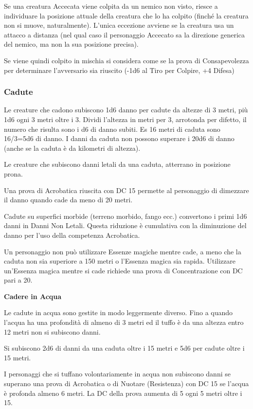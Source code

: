 \documentclass[a4paper,11pt,twoside,openany]{book}
\begin{document}
Se una creatura Accecata viene colpita da un nemico non visto, riesce a individuare la posizione attuale della creatura che lo ha colpito (finché la creatura non si muove, naturalmente). L'unica eccezione avviene se la creatura usa un attacco a distanza (nel qual caso il personaggio Accecato sa la direzione generica del nemico, ma non la sua posizione precisa).

Se viene quindi colpito in mischia si considera come se la prova di Consapevolezza per determinare l'avversario sia riuscito (-1d6 al Tiro per Colpire, +4 Difesa)

\subsubsection{Cadute}

\label{cadute}

Le creature che cadono subiscono 1d6 danno per cadute da altezze di 3 metri, più 1d6 ogni 3 metri oltre i 3. Dividi l'altezza in metri per 3, arrotonda per difetto, il numero che risulta sono i d6 di danno subiti. Es 16 metri di caduta sono 16/3=5d6 di danno. I danni da caduta non possono superare i 20d6 di danno (anche se la caduta è da kilometri di altezza).

Le creature che subiscono danni letali da una caduta, atterrano in posizione prona.

Una prova di Acrobatica riuscita con DC 15 permette al personaggio di dimezzare il danno quando cade da meno di 20 metri.

Cadute su superfici morbide (terreno morbido, fango ecc.) convertono i primi 1d6 danni in Danni Non Letali. Questa riduzione è cumulativa con la diminuzione del danno per l'uso della competenza Acrobatica.

Un personaggio non può utilizzare Essenze magiche mentre cade, a meno che la caduta non sia superiore a 150 metri o l'Essenza magica sia rapida. Utilizzare un'Essenza magica mentre si cade richiede una prova di Concentrazione con DC pari a 20.

\textbf{Cadere in Acqua}

Le cadute in acqua sono gestite in modo leggermente diverso. Fino a quando l'acqua ha una profondità di almeno di 3 metri ed il tuffo è da una altezza entro 12 metri non si subiscono danni.

Si subiscono 2d6 di danni da una caduta oltre i 15 metri e 5d6 per cadute oltre i 15 metri.

I personaggi che si tuffano volontariamente in acqua non subiscono danni se superano una prova di Acrobatica o di Nuotare (Resistenza) con DC 15 se l'acqua è profonda almeno 6 metri. La DC della prova aumenta di 5 ogni 5 metri oltre i 15.
\end{document}
